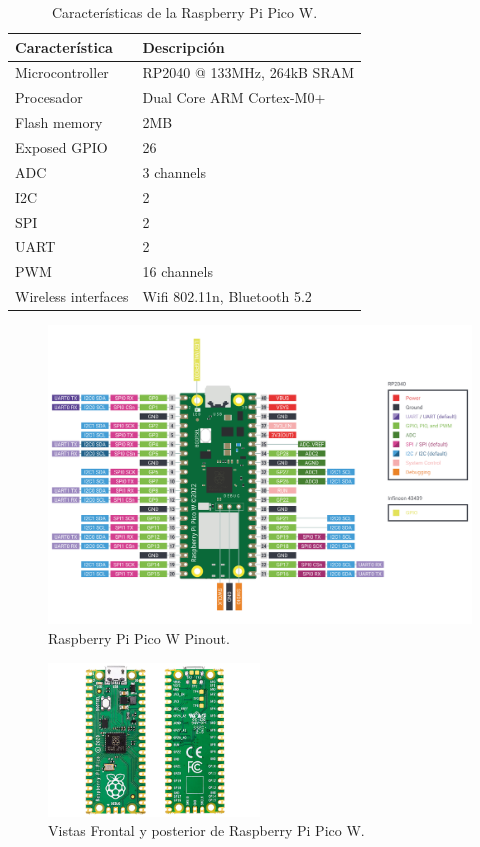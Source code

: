 \begin{table}[htbp]
\begin{center}
\caption{Características de la Raspberry Pi Pico W.}
\begin{tabular}{|l|l|}
\hline
\rowcolor[HTML]{C0C0C0} 
\textbf{Característica} & \textbf{Descripción}\\ \hline
Microcontroller	& RP2040 @ 133MHz, 264kB SRAM \\ \hline
Procesador & Dual Core ARM Cortex-M0+ \\ \hline
Flash memory &	2MB \\ \hline
Exposed GPIO & 26 \\ \hline
ADC	& 3 channels \\ \hline
I2C	& 2 \\ \hline
SPI	& 2 \\ \hline
UART & 2 \\ \hline
PWM	& 16 channels	 \\ \hline
Wireless interfaces & Wifi 802.11n, Bluetooth 5.2\\ \hline
\end{tabular}
\end{center}
\end{table}
\pagebreak

\begin{figure}[h]
    \centering
    \includegraphics[width=1\textwidth]{img/herramientas/picow.png}
    \caption{Raspberry Pi Pico W Pinout.}
\end{figure}

\begin{figure}[h]
    \centering
    \includegraphics[width=0.5\textwidth]{img/herramientas/picow_vistas.png}
    \caption{Vistas Frontal y posterior de Raspberry Pi Pico W.}
\end{figure}

